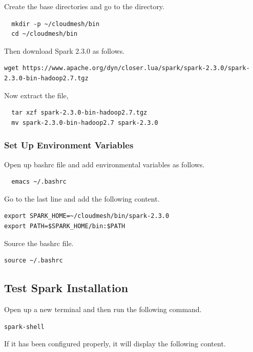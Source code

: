 Create the base directories and go to the directory.

\begin{lstlisting}
  mkdir -p ~/cloudmesh/bin
  cd ~/cloudmesh/bin
\end{lstlisting}
  
Then download Spark 2.3.0 as follows. 

\begin{lstlisting}
wget https://www.apache.org/dyn/closer.lua/spark/spark-2.3.0/spark-2.3.0-bin-hadoop2.7.tgz
\end{lstlisting}

Now extract the file,

\begin{lstlisting}
  tar xzf spark-2.3.0-bin-hadoop2.7.tgz
  mv spark-2.3.0-bin-hadoop2.7 spark-2.3.0
\end{lstlisting}

\subsubsection{Set Up Environment Variables}

Open up bashrc file and add environmental variables as follows.

\begin{lstlisting}
  emacs ~/.bashrc  
\end{lstlisting}

Go to the last line and add the following content.

\begin{lstlisting}
export SPARK_HOME=~/cloudmesh/bin/spark-2.3.0
export PATH=$SPARK_HOME/bin:$PATH
\end{lstlisting}  

Source the bashrc file.

\begin{lstlisting}
source ~/.bashrc
\end{lstlisting}

\subsection{Test Spark Installation}

Open up a new terminal and then run the following command.

\begin{lstlisting}
spark-shell
\end{lstlisting}

If it has been configured properly, it will display the following content.

